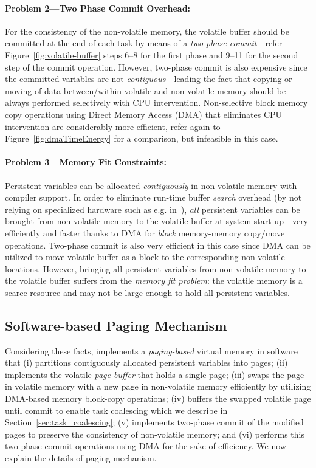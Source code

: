 \paragraph{Problem 2---Two Phase Commit Overhead:} For the consistency of the non-volatile memory, the volatile buffer should be committed at the end of each task by means of a \emph{two-phase commit}---refer Figure~\ref{fig:volatile-buffer} steps 6--8 for the first phase and 9--11 for the second step of the commit operation. However, two-phase commit is also expensive since the committed variables are not \emph{contiguous}---leading the fact that copying or moving of data between/within volatile and non-volatile memory should be always performed selectively with CPU intervention. Non-selective block memory copy operations using Direct Memory Access (DMA) that eliminates CPU intervention are considerably more efficient, refer again to Figure~\ref{fig:dmaTimeEnergy} for a comparison, but infeasible in this case.

\paragraph{Problem 3---Memory Fit Constraints:} Persistent variables can be allocated \emph{contiguously} in non-volatile memory with compiler support. In order to eliminate run-time buffer \emph{search} overhead (by not relying on specialized hardware such as e.g. in~\cite{hicks_isca_2017}), \emph{all} persistent variables can be brought from non-volatile memory to the volatile buffer at system start-up---very efficiently and faster thanks to DMA for \emph{block} memory-memory copy/move operations. Two-phase commit is also very efficient in this case since DMA can be utilized to move volatile buffer as a block to the corresponding non-volatile locations. However, bringing all persistent variables from non-volatile memory to the volatile buffer suffers from the \emph{memory fit problem}: the volatile memory is a scarce resource and may not be large enough to hold all persistent variables.

\subsection{Software-based Paging Mechanism} 

Considering these facts, \sys implements a \emph{paging-based} virtual memory in software that (i) partitions contiguously allocated persistent variables into pages; (ii) implements the volatile \emph{page buffer} that holds a single page; (iii) swaps the page in volatile memory with a new page in non-volatile memory efficiently by utilizing DMA-based memory block-copy operations; (iv) buffers the swapped volatile page until commit to enable task coalescing which we describe in Section~\ref{sec:task_coalescing}; (v) implements two-phase commit of the modified pages to preserve the consistency of non-volatile memory; and (vi) performs this two-phase commit operations using DMA for the sake of efficiency. We now explain the details of \sys paging mechanism.


